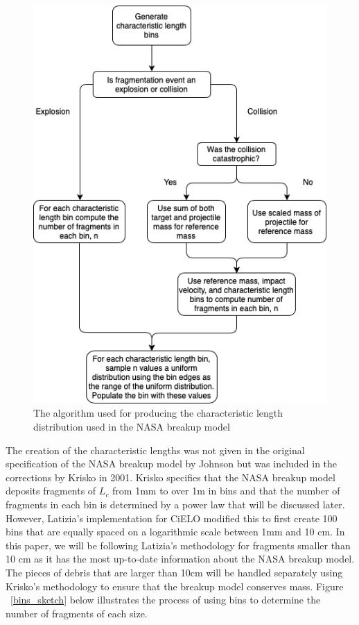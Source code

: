 \documentclass[a4paper, 12pt]{article}
\begin{document}
\begin{figure}[H]
	\centering
	\includegraphics[scale=0.5, trim=0cm 0cm 0cm 5cm]{L_c_flow}
	\caption{The algorithm used for producing the characteristic length distribution used in the NASA breakup model}
\end{figure}

The creation of the characteristic lengths was not given in the original specification of the NASA breakup model by Johnson \citep{johnson_nasas_2001} but was included in the corrections by Krisko in 2001. Krisko specifies that the NASA breakup model deposits fragments of $L_c$ from 1mm to over 1m in bins and that the number of fragments in each bin is determined by a power law that will be discussed later. However, Latizia's implementation for CiELO modified this to first create 100 bins that are equally spaced on a logarithmic scale between 1mm and 10 cm. In this paper, we will be following Latizia's methodology for fragments smaller than 10 cm as it has the most up-to-date information about the NASA breakup model. The pieces of debris that are larger than 10cm will be handled separately using Krisko's methodology to ensure that the breakup model conserves mass. Figure ~\ref{bins_sketch} below illustrates the process of using bins to determine the number of fragments of each size.
\end{document}

